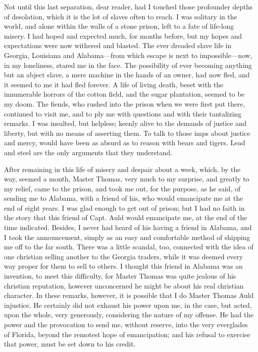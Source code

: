 Not until this last separation, dear reader, had I touched those
profounder depths of desolation, which it is the lot of slaves often to
reach. I was solitary in the world, and alone within the walls of a
stone prison, left to a fate of life-long misery. I had hoped and
expected much, for months before, but my hopes and expectations were now
withered and blasted. The ever dreaded slave life in Georgia, Louisiana
and Alabama---from which escape is next to impossible---now, in my
loneliness, stared me in the face. The possibility of ever becoming
anything but an abject slave, a mere machine in the hands of an owner,
had now fled, and it seemed to me it had fled forever. A life of living
death, beset with the innumerable {\protect\hypertarget{302}{}{}}horrors
of the cotton field, and the sugar plantation, seemed to be my doom. The
fiends, who rushed into the prison when we were first put there,
continued to visit me, and to ply me with questions and with their
tantalizing remarks. I was insulted, but helpless; keenly alive to the
demands of justice and liberty, but with no means of asserting them. To
talk to those imps about justice and mercy, would have been as absurd as
to reason with bears and tigers. Lead and steel are the only arguments
that they understand.

After remaining in this life of misery and despair about a week, which,
by the way, seemed a month, Master Thomas, very much to my surprise, and
greatly to my relief, came to the prison, and took me out, for the
purpose, as he said, of sending me to Alabama, with a friend of his, who
would emancipate me at the end of eight years. I was glad enough to get
out of prison; but I had no faith in the story that this friend of Capt.
Auld would emancipate me, at the end of the time indicated. Besides, I
never had heard of his having a friend in Alabama, and I took the
announcement, simply as an easy and comfortable method of shipping me
off to the far south. There was a little scandal, too, connected with
the idea of one christian selling another to the Georgia traders, while
it was deemed every way proper for them to sell to others. I thought
this friend in Alabama was an invention, to meet this difficulty, for
Master Thomas was quite jealous of his christian reputation, however
unconcerned he might be about his real christian character. In these
remarks, however, it is possible that I do
{\protect\hypertarget{303}{}{}}Master Thomas Auld injustice. He
certainly did not exhaust his power upon me, in the case, but acted,
upon the whole, very generously, considering the nature of my offense.
He had the power and the provocation to send me, without reserve, into
the very everglades of Florida, beyond the remotest hope of
emancipation; and his refusal to exercise that power, must be set down
to his credit.

